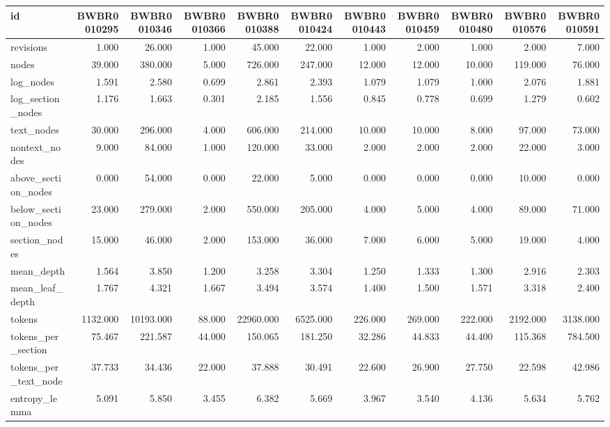 \begin{tabular}{lrrrrrrrrrr}
\toprule
id & BWBR0010295 & BWBR0010346 & BWBR0010366 & BWBR0010388 & BWBR0010424 & BWBR0010443 & BWBR0010459 & BWBR0010480 & BWBR0010576 & BWBR0010591 \\
\midrule
revisions & 1.000 & 26.000 & 1.000 & 45.000 & 22.000 & 1.000 & 2.000 & 1.000 & 2.000 & 7.000 \\
\cline{1-11}
nodes & 39.000 & 380.000 & 5.000 & 726.000 & 247.000 & 12.000 & 12.000 & 10.000 & 119.000 & 76.000 \\
\cline{1-11}
log\_nodes & 1.591 & 2.580 & 0.699 & 2.861 & 2.393 & 1.079 & 1.079 & 1.000 & 2.076 & 1.881 \\
\cline{1-11}
log\_section\_nodes & 1.176 & 1.663 & 0.301 & 2.185 & 1.556 & 0.845 & 0.778 & 0.699 & 1.279 & 0.602 \\
\cline{1-11}
text\_nodes & 30.000 & 296.000 & 4.000 & 606.000 & 214.000 & 10.000 & 10.000 & 8.000 & 97.000 & 73.000 \\
\cline{1-11}
nontext\_nodes & 9.000 & 84.000 & 1.000 & 120.000 & 33.000 & 2.000 & 2.000 & 2.000 & 22.000 & 3.000 \\
\cline{1-11}
above\_section\_nodes & 0.000 & 54.000 & 0.000 & 22.000 & 5.000 & 0.000 & 0.000 & 0.000 & 10.000 & 0.000 \\
\cline{1-11}
below\_section\_nodes & 23.000 & 279.000 & 2.000 & 550.000 & 205.000 & 4.000 & 5.000 & 4.000 & 89.000 & 71.000 \\
\cline{1-11}
section\_nodes & 15.000 & 46.000 & 2.000 & 153.000 & 36.000 & 7.000 & 6.000 & 5.000 & 19.000 & 4.000 \\
\cline{1-11}
mean\_depth & 1.564 & 3.850 & 1.200 & 3.258 & 3.304 & 1.250 & 1.333 & 1.300 & 2.916 & 2.303 \\
\cline{1-11}
mean\_leaf\_depth & 1.767 & 4.321 & 1.667 & 3.494 & 3.574 & 1.400 & 1.500 & 1.571 & 3.318 & 2.400 \\
\cline{1-11}
tokens & 1132.000 & 10193.000 & 88.000 & 22960.000 & 6525.000 & 226.000 & 269.000 & 222.000 & 2192.000 & 3138.000 \\
\cline{1-11}
tokens\_per\_section & 75.467 & 221.587 & 44.000 & 150.065 & 181.250 & 32.286 & 44.833 & 44.400 & 115.368 & 784.500 \\
\cline{1-11}
tokens\_per\_text\_node & 37.733 & 34.436 & 22.000 & 37.888 & 30.491 & 22.600 & 26.900 & 27.750 & 22.598 & 42.986 \\
\cline{1-11}
entropy\_lemma & 5.091 & 5.850 & 3.455 & 6.382 & 5.669 & 3.967 & 3.540 & 4.136 & 5.634 & 5.762 \\

\end{tabular}
